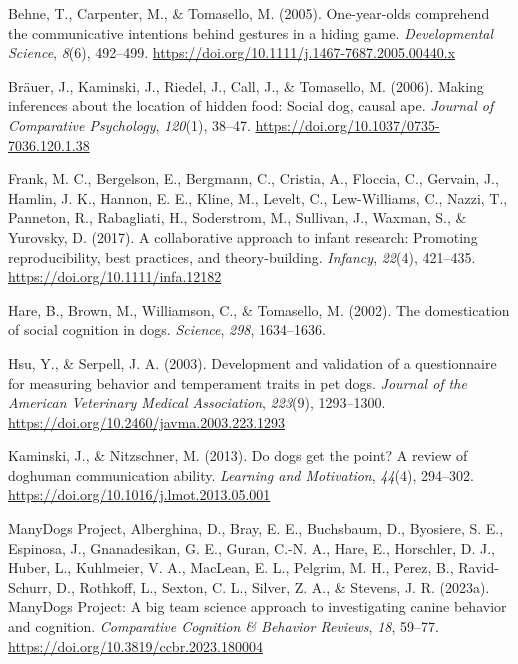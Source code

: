 \documentclass[
  man,floatsintext]{apa6}
\newlength{\cslhangindent}
\newlength{\cslentryspacingunit} %
\newenvironment{CSLReferences}[2] %
 {%
  \setlength{\parindent}{0pt}
  \ifodd #1
  \let\oldpar\par
  \def\par{\hangindent=\cslhangindent\oldpar}
  \fi
  \setlength{\parskip}{#2\cslentryspacingunit}
 }%
 {}
\begin{document}
\hypertarget{refs}{}
\begin{CSLReferences}{1}{0}
\leavevmode{}%
Behne, T., Carpenter, M., \& Tomasello, M. (2005). One-year-olds comprehend the communicative intentions behind gestures in a hiding game. \emph{Developmental Science}, \emph{8}(6), 492--499. \url{https://doi.org/10.1111/j.1467-7687.2005.00440.x}

\leavevmode{}%
Bräuer, J., Kaminski, J., Riedel, J., Call, J., \& Tomasello, M. (2006). Making inferences about the location of hidden food: {Social} dog, causal ape. \emph{Journal of Comparative Psychology}, \emph{120}(1), 38--47. \url{https://doi.org/10.1037/0735-7036.120.1.38}

\leavevmode{}%
Frank, M. C., Bergelson, E., Bergmann, C., Cristia, A., Floccia, C., Gervain, J., Hamlin, J. K., Hannon, E. E., Kline, M., Levelt, C., Lew-Williams, C., Nazzi, T., Panneton, R., Rabagliati, H., Soderstrom, M., Sullivan, J., Waxman, S., \& Yurovsky, D. (2017). A collaborative approach to infant research: Promoting reproducibility, best practices, and theory-building. \emph{Infancy}, \emph{22}(4), 421--435. \url{https://doi.org/10.1111/infa.12182}

\leavevmode{}%
Hare, B., Brown, M., Williamson, C., \& Tomasello, M. (2002). The domestication of social cognition in dogs. \emph{Science}, \emph{298}, 1634--1636.

\leavevmode{}%
Hsu, Y., \& Serpell, J. A. (2003). Development and validation of a questionnaire for measuring behavior and temperament traits in pet dogs. \emph{Journal of the American Veterinary Medical Association}, \emph{223}(9), 1293--1300. \url{https://doi.org/10.2460/javma.2003.223.1293}

\leavevmode{}%
Kaminski, J., \& Nitzschner, M. (2013). Do dogs get the point? {A} review of dog{\textendash}human communication ability. \emph{Learning and Motivation}, \emph{44}(4), 294--302. \url{https://doi.org/10.1016/j.lmot.2013.05.001}

\leavevmode{}%
ManyDogs Project, Alberghina, D., Bray, E. E., Buchsbaum, D., Byosiere, S. E., Espinosa, J., Gnanadesikan, G. E., Guran, C.-N. A., Hare, E., Horschler, D. J., Huber, L., Kuhlmeier, V. A., MacLean, E. L., Pelgrim, M. H., Perez, B., Ravid-Schurr, D., Rothkoff, L., Sexton, C. L., Silver, Z. A., \& Stevens, J. R. (2023a). {ManyDogs Project}: {A} big team science approach to investigating canine behavior and cognition. \emph{Comparative Cognition \& Behavior Reviews}, \emph{18}, 59--77. \url{https://doi.org/10.3819/ccbr.2023.180004}


\end{CSLReferences}
\end{document}
